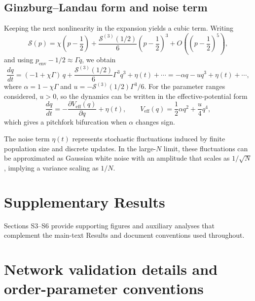 \documentclass[11pt]{article}
\begin{document}
\subsection{Ginzburg--Landau form and noise term}

Keeping the next nonlinearity in the expansion yields a cubic term. Writing
\begin{equation}
\mathcal{S}(p)=\chi\left(p-\frac{1}{2}\right)+\frac{\mathcal{S}^{(3)}(1/2)}{6}\left(p-\frac{1}{2}\right)^3+O\!\left(\left(p-\frac{1}{2}\right)^5\right),
\end{equation}
and using $p_{\text{env}}-1/2\approx \Gamma q$, we obtain
\begin{equation}
\frac{dq}{dt}=(-1+\chi\Gamma)\,q+\frac{\mathcal{S}^{(3)}(1/2)}{6}\Gamma^3 q^3+\eta(t)+\cdots
=-\alpha q-u q^3+\eta(t)+\cdots,
\end{equation}
where $\alpha=1-\chi\Gamma$ and $u=-\mathcal{S}^{(3)}(1/2)\Gamma^3/6$. For the parameter ranges considered, $u>0$, so the dynamics can be written in the effective-potential form
\begin{equation}
\frac{dq}{dt}=-\frac{\partial V_{\text{eff}}(q)}{\partial q}+\eta(t),\qquad
V_{\text{eff}}(q)=\frac{1}{2}\alpha q^2+\frac{u}{4}q^4,
\end{equation}
which gives a pitchfork bifurcation when $\alpha$ changes sign.

The noise term $\eta(t)$ represents stochastic fluctuations induced by finite population size and discrete updates. In the large-$N$ limit, these fluctuations can be approximated as Gaussian white noise with an amplitude that scales as $1/\sqrt{N}$, implying a variance scaling as $1/N$.
\FloatBarrier

\section*{Supplementary Results}
\noindent Sections S3--S6 provide supporting figures and auxiliary analyses that complement the main-text Results and document conventions used throughout.
\FloatBarrier

\section{Network validation details and order-parameter conventions}
\label{supp:s3-theory-network}
\end{document}
